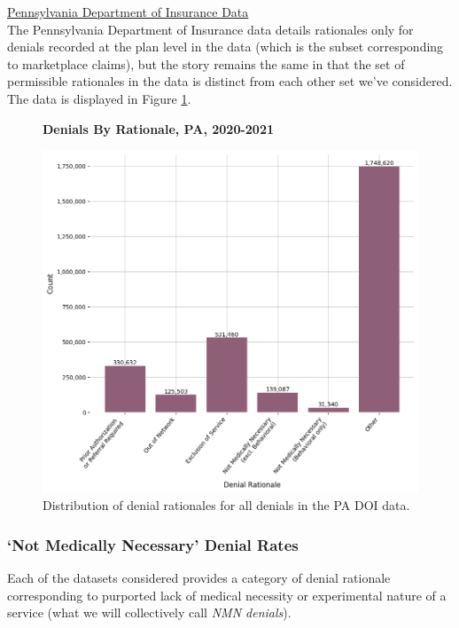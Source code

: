 \documentclass[12pt, a4paper,twoside]{report}
\theoremstyle{plain} %
\theoremstyle{definition} %
\theoremstyle{remark} %
\numberwithin{equation}{chapter}
\begin{document}
		\underline{Pennsylvania Department of Insurance Data}\\
		
		The Pennsylvania Department of Insurance data details rationales only for denials recorded at the plan level in the data (which is the subset corresponding to marketplace claims), but the story remains the same in that the set of permissible rationales in the data is distinct from each other set we've considered. The data is displayed in Figure \ref{parationaledist}.
		
		\begin{figure}[h!]
			\centering
			\textbf{Denials By Rationale, PA, 2020-2021}\par\medskip
			\includegraphics[width=\columnwidth]{images/pa_claims/denial_rationale_dist_2020-2021.png}
			\caption{Distribution of denial rationales for all denials in the PA DOI data.}
			\label{parationaledist}
		\end{figure}
		
		\subsubsection{`Not Medically Necessary' Denial Rates}
		
		Each of the datasets considered provides a category of denial rationale corresponding to purported lack of medical necessity or experimental nature of a service (what we will collectively call \emph{NMN denials}).\\
		
\end{document}
